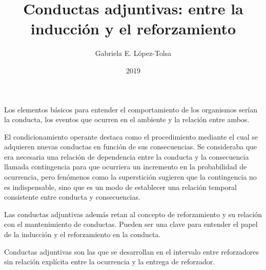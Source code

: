 \documentclass[a4paper,12pt]{article}
\title{Conductas adjuntivas: entre la inducción y el reforzamiento}
\author{Gabriela E. López-Tolsa}
\date{2019}
\begin{document}
{\scshape\bfseries \maketitle}

Los elementos básicos para entender el comportamiento de los organismos serían la conducta, los eventos que ocurren en el ambiente y la relación entre ambos.

El condicionamiento operante destaca como el procedimiento mediante el cual se adquieren nuevas conductas en función de sus consecuencias. Se consideraba que era necesaria una relación de dependencia entre la conducta y la consecuencia llamada contingencia para que ocurriera un incremento en la probabilidad de ocurrencia, pero fenómenos como la superstición sugieren que la contingencia no es indispensable, sino que es un modo de establecer una relación temporal consistente entre conducta y consecuencias.

Las conductas adjuntivas además retan al concepto de reforzamiento y su relación con el mantenimiento de conductas. Pueden ser una clave para entender el papel de la inducción y el reforzamiento en la conducta.

Conductas adjuntivas son las que se desarrollan en el intervalo entre reforzadores sin relación explícita entre la ocurrencia y la entrega de reforzador.
\end{document}
